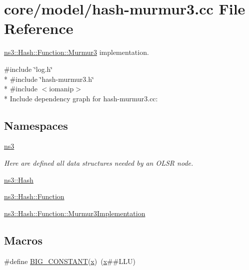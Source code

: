 \hypertarget{hash-murmur3_8cc}{}\section{core/model/hash-\/murmur3.cc File Reference}
\label{hash-murmur3_8cc}


\hyperlink{classns3_1_1Hash_1_1Function_1_1Murmur3}{ns3\+::\+Hash\+::\+Function\+::\+Murmur3} implementation.  


{\ttfamily \#include \char`\"{}log.\+h\char`\"{}}\\*
{\ttfamily \#include \char`\"{}hash-\/murmur3.\+h\char`\"{}}\\*
{\ttfamily \#include $<$iomanip$>$}\\*
Include dependency graph for hash-\/murmur3.cc\+:
\subsection*{Namespaces}
\begin{DoxyCompactItemize}
\item 
 \hyperlink{namespacens3}{ns3}
\begin{DoxyCompactList}\small\item\em Here are defined all data structures needed by an O\+L\+SR node. \end{DoxyCompactList}\item 
 \hyperlink{namespacens3_1_1Hash}{ns3\+::\+Hash}
\item 
 \hyperlink{namespacens3_1_1Hash_1_1Function}{ns3\+::\+Hash\+::\+Function}
\item 
 \hyperlink{namespacens3_1_1Hash_1_1Function_1_1Murmur3Implementation}{ns3\+::\+Hash\+::\+Function\+::\+Murmur3\+Implementation}
\end{DoxyCompactItemize}
\subsection*{Macros}
\begin{DoxyCompactItemize}
\item 
\#define \hyperlink{group__hash__murmur3_ga8e0f90a6ea3d3db65033b8ace70cb65a}{B\+I\+G\+\_\+\+C\+O\+N\+S\+T\+A\+NT}(\hyperlink{lte__link__budget__x2__handover__measures_8m_a9336ebf25087d91c818ee6e9ec29f8c1}{x})~(\hyperlink{lte__link__budget__x2__handover__measures_8m_a9336ebf25087d91c818ee6e9ec29f8c1}{x}\#\#L\+LU)
\end{DoxyCompactItemize}
